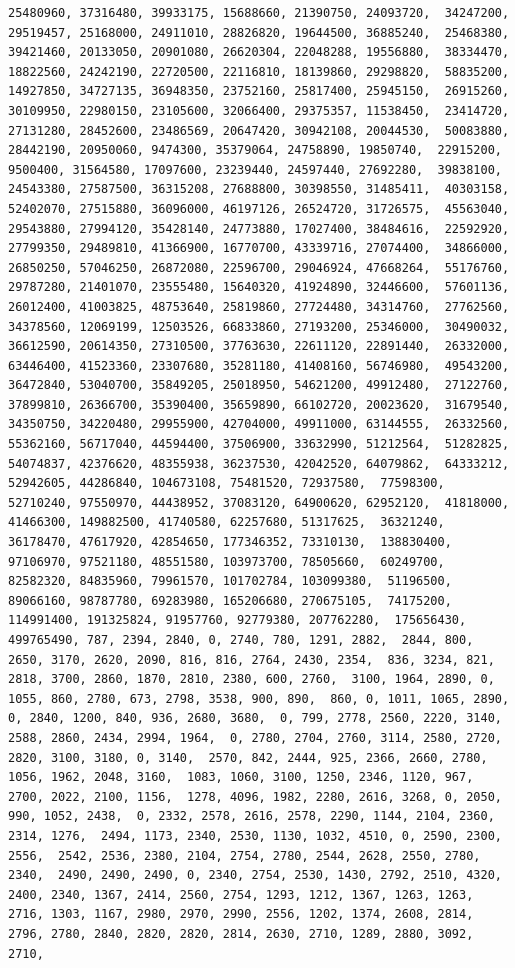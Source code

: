 \documentclass[
]{article}
\begin{document}
\begin{verbatim}
25480960, 37316480, 39933175, 15688660, 21390750, 24093720,  34247200, 29519457, 25168000, 24911010, 28826820, 19644500, 36885240,  25468380, 39421460, 20133050, 20901080, 26620304, 22048288, 19556880,  38334470, 18822560, 24242190, 22720500, 22116810, 18139860, 29298820,  58835200, 14927850, 34727135, 36948350, 23752160, 25817400, 25945150,  26915260, 30109950, 22980150, 23105600, 32066400, 29375357, 11538450,  23414720, 27131280, 28452600, 23486569, 20647420, 30942108, 20044530,  50083880, 28442190, 20950060, 9474300, 35379064, 24758890, 19850740,  22915200, 9500400, 31564580, 17097600, 23239440, 24597440, 27692280,  39838100, 24543380, 27587500, 36315208, 27688800, 30398550, 31485411,  40303158, 52402070, 27515880, 36096000, 46197126, 26524720, 31726575,  45563040, 29543880, 27994120, 35428140, 24773880, 17027400, 38484616,  22592920, 27799350, 29489810, 41366900, 16770700, 43339716, 27074400,  34866000, 26850250, 57046250, 26872080, 22596700, 29046924, 47668264,  55176760, 29787280, 21401070, 23555480, 15640320, 41924890, 32446600,  57601136, 26012400, 41003825, 48753640, 25819860, 27724480, 34314760,  27762560, 34378560, 12069199, 12503526, 66833860, 27193200, 25346000,  30490032, 36612590, 20614350, 27310500, 37763630, 22611120, 22891440,  26332000, 63446400, 41523360, 23307680, 35281180, 41408160, 56746980,  49543200, 36472840, 53040700, 35849205, 25018950, 54621200, 49912480,  27122760, 37899810, 26366700, 35390400, 35659890, 66102720, 20023620,  31679540, 34350750, 34220480, 29955900, 42704000, 49911000, 63144555,  26332560, 55362160, 56717040, 44594400, 37506900, 33632990, 51212564,  51282825, 54074837, 42376620, 48355938, 36237530, 42042520, 64079862,  64333212, 52942605, 44286840, 104673108, 75481520, 72937580,  77598300, 52710240, 97550970, 44438952, 37083120, 64900620, 62952120,  41818000, 41466300, 149882500, 41740580, 62257680, 51317625,  36321240, 36178470, 47617920, 42854650, 177346352, 73310130,  138830400, 97106970, 97521180, 48551580, 103973700, 78505660,  60249700, 82582320, 84835960, 79961570, 101702784, 103099380,  51196500, 89066160, 98787780, 69283980, 165206680, 270675105,  74175200, 114991400, 191325824, 91957760, 92779380, 207762280,  175656430, 499765490, 787, 2394, 2840, 0, 2740, 780, 1291, 2882,  2844, 800, 2650, 3170, 2620, 2090, 816, 816, 2764, 2430, 2354,  836, 3234, 821, 2818, 3700, 2860, 1870, 2810, 2380, 600, 2760,  3100, 1964, 2890, 0, 1055, 860, 2780, 673, 2798, 3538, 900, 890,  860, 0, 1011, 1065, 2890, 0, 2840, 1200, 840, 936, 2680, 3680,  0, 799, 2778, 2560, 2220, 3140, 2588, 2860, 2434, 2994, 1964,  0, 2780, 2704, 2760, 3114, 2580, 2720, 2820, 3100, 3180, 0, 3140,  2570, 842, 2444, 925, 2366, 2660, 2780, 1056, 1962, 2048, 3160,  1083, 1060, 3100, 1250, 2346, 1120, 967, 2700, 2022, 2100, 1156,  1278, 4096, 1982, 2280, 2616, 3268, 0, 2050, 990, 1052, 2438,  0, 2332, 2578, 2616, 2578, 2290, 1144, 2104, 2360, 2314, 1276,  2494, 1173, 2340, 2530, 1130, 1032, 4510, 0, 2590, 2300, 2556,  2542, 2536, 2380, 2104, 2754, 2780, 2544, 2628, 2550, 2780, 2340,  2490, 2490, 2490, 0, 2340, 2754, 2530, 1430, 2792, 2510, 4320,  2400, 2340, 1367, 2414, 2560, 2754, 1293, 1212, 1367, 1263, 1263,  2716, 1303, 1167, 2980, 2970, 2990, 2556, 1202, 1374, 2608, 2814,  2796, 2780, 2840, 2820, 2820, 2814, 2630, 2710, 1289, 2880, 3092,  2710, 
\end{verbatim}
\end{document}

